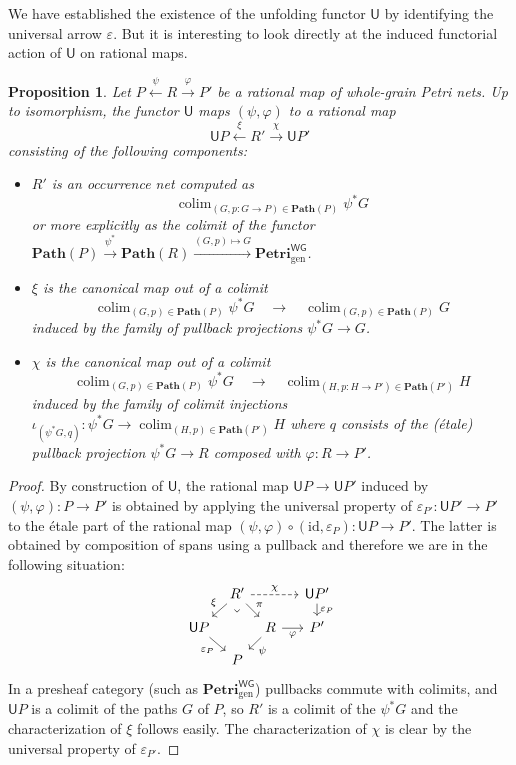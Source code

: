 \documentclass[11pt,a4paper]{article}
\theoremstyle{plain}
\newtheorem{proposition}[theorem]{Proposition}
\theoremstyle{definition}
\theoremstyle{remark}
\newcommand{\WGPetri}{\mathbf{Petri}^{\mathsf{WG}}}
\newcommand{\U}{\mathsf{U}}
\newcommand{\id}{\mathrm{id}}
\newcommand{\Colim}{\colim}
\DeclareMathOperator*{\colim}{colim}
\newcommand{\Path}{\mathbf{Path}}
\begin{document}
We have established the existence of the unfolding functor $\U$ by identifying the universal arrow $\varepsilon$. But it is interesting to look directly at the induced functorial action of $\U$ on rational maps. 
\begin{proposition}
Let $P \xleftarrow{\psi} R \xrightarrow{\varphi} P'$ be a rational map of whole-grain Petri nets. Up to isomorphism, the functor $\U$ maps $(\psi, \varphi)$ to a rational map \[ \U P \xleftarrow{\xi} R' \xrightarrow{\chi} \U P' \] 
consisting of the following components:
\begin{itemize}
	\item $R'$ is an occurrence net computed as \[ \Colim_{(G, p : G \to P) \in \Path(P)} \psi^* G \] or more explicitly as the colimit of the functor $\Path(P) \xrightarrow{\psi^*} \Path(R) \xrightarrow{(G, p) \mapsto G} \WGPetri_{\mathrm{gen}}$.
	\item $\xi$ is the canonical map out of a colimit \[ \Colim_{(G, p) \in \Path(P)} \psi^* G \quad \longrightarrow \quad \Colim_{(G, p) \in \Path(P)} G \] 
	induced by the family of pullback projections $\psi^* G \to G$.
	\item $\chi$ is the canonical map out of a colimit
\[
 \Colim_{(G, p) \in \Path(P)} \psi^* G \quad \longrightarrow \quad \Colim_{(H, p : H \to P') \in \Path(P')} H
 \] 
 induced by the family of colimit injections $\iota_{(\psi^* G, q)} : \psi^* G \to   \Colim_{(H, p) \in \Path(P')} H$ where $q$ consists of the (\'etale) pullback projection $\psi^* G \to R$ composed with $\varphi : R \to P'$. 
\end{itemize}
\end{proposition}
\begin{proof}
By construction of $\U$, the rational map $\U P \to \U P'$ induced by $(\psi, \varphi) : P \to P'$ is obtained by applying the universal property of $\varepsilon_{P'} : \U P' \to P'$ to the \'etale part of the rational map $(\psi, \varphi) \circ (\id, \varepsilon_P) :  \U P \to P'$. The latter is obtained by composition of spans using a pullback and therefore we are in the following situation:
\[\begin{tikzcd}[row sep=small, column sep=tiny]
	& {R'} &&& {\U P'} \\
	{\U P} && R && {P'} \\
	& P
	\arrow["\chi", dashed, from=1-2, to=1-5]
	\arrow["\xi"', from=1-2, to=2-1]
	\arrow["\pi", from=1-2, to=2-3]
	\arrow["\lrcorner"{anchor=center, pos=0.125, rotate=-45}, draw=none, from=1-2, to=3-2]
	\arrow["{\varepsilon_P}", from=1-5, to=2-5]
	\arrow["{\varepsilon_P}"', from=2-1, to=3-2]
	\arrow["\varphi"', from=2-3, to=2-5]
	\arrow["\psi", from=2-3, to=3-2]
\end{tikzcd}\]
In a presheaf category (such as $\WGPetri_\mathrm{gen}$) pullbacks commute with colimits, and $\U P$ is a colimit of the paths $G$ of $P$, so $R'$ is a colimit of the $\psi^* G$ and the characterization of $\xi$ follows easily. The characterization of $\chi$ is clear by the universal property of $\varepsilon_{P'}$. 
\end{proof}
\end{document}
